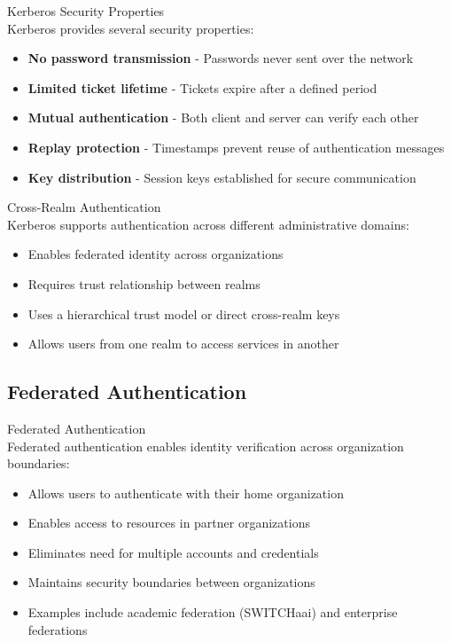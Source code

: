 \begin{theorem}{Kerberos Security Properties}\\
Kerberos provides several security properties:
\begin{itemize}
    \item \textbf{No password transmission} - Passwords never sent over the network
    \item \textbf{Limited ticket lifetime} - Tickets expire after a defined period
    \item \textbf{Mutual authentication} - Both client and server can verify each other
    \item \textbf{Replay protection} - Timestamps prevent reuse of authentication messages
    \item \textbf{Key distribution} - Session keys established for secure communication
\end{itemize}
\end{theorem}

\begin{concept}{Cross-Realm Authentication}\\
Kerberos supports authentication across different administrative domains:
\begin{itemize}
    \item Enables federated identity across organizations
    \item Requires trust relationship between realms
    \item Uses a hierarchical trust model or direct cross-realm keys
    \item Allows users from one realm to access services in another
\end{itemize}
\end{concept}

\subsection{Federated Authentication}

\begin{definition}{Federated Authentication}\\
Federated authentication enables identity verification across organization boundaries:
\begin{itemize}
    \item Allows users to authenticate with their home organization
    \item Enables access to resources in partner organizations
    \item Eliminates need for multiple accounts and credentials
    \item Maintains security boundaries between organizations
    \item Examples include academic federation (SWITCHaai) and enterprise federations
\end{itemize}
\end{definition}

